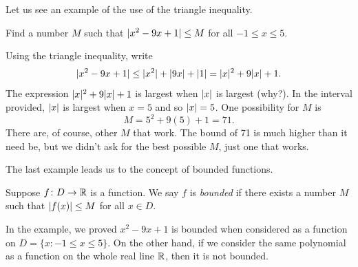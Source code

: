 Let us see an example of the use of the triangle inequality.

\begin{example}
Find a number $M$ such that $\lvert {x^2-9x+1} \rvert \leq M$ for all $-1 \leq x \leq
5$.

Using the triangle inequality, write
\begin{equation*}
\lvert {x^2-9x+1} \rvert \leq \lvert {x^2} \rvert+\lvert {9x} \rvert+\lvert {1} \rvert
=
\lvert {x} \rvert^2+9\lvert {x} \rvert+1 .
\end{equation*}
The expression
$\lvert {x} \rvert^2+9\lvert {x} \rvert+1$ is largest when $\left\lvert {x} \right\rvert$ is largest (why?).  In the interval
provided, $\left\lvert {x} \right\rvert$ is largest when $x=5$ and so $\left\lvert {x} \right\rvert=5$.  One
possibility for $M$ is
\begin{equation*}
M = 5^2+9(5)+1 = 71 .
\end{equation*}
There are, of course, other $M$ that work.  The bound of 71
is much higher than it
need be, but we didn't ask for the best possible $M$, just one that works.
\end{example}

The last example leads us to the concept of bounded functions.

\begin{defn}
Suppose $f \colon D \to {\mathbb{R}}$ is a function.  We say $f$ is
\emph{bounded}
if there exists a number $M$
such that $\left\lvert {f(x)} \right\rvert \leq M$ for all $x \in D$.
\end{defn}

In the example, we proved $x^2-9x+1$ is bounded when considered as a
function on $D = \{ x : -1 \leq x \leq 5 \}$.   On the other hand,
if we consider the same polynomial as a function on the whole real line ${\mathbb{R}}$,
then it is not bounded.

